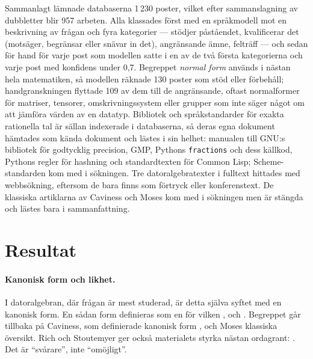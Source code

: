 Sammanlagt lämnade databaserna 1\,230 poster, vilket efter
sammanslagning av dubbletter blir 957 arbeten.  Alla klassades först
med en språkmodell mot en beskrivning av frågan och fyra kategorier ---
stödjer påståendet, kvalificerar det (motsäger, begränsar eller snävar
in det), angränsande ämne, felträff --- och sedan för hand för varje
post som modellen satte i en av de två första kategorierna och varje
post med konfidens under 0,7.  Begreppet \emph{normal form} används i
nästan hela matematiken, så modellen räknade 130 poster som stöd eller
förbehåll; handgranskningen flyttade 109 av dem till de
angränsande, oftast normalformer för matriser, tensorer,
omskrivningssystem eller grupper som inte säger något om att jämföra
värden av en datatyp.
Bibliotek och språkstandarder för exakta rationella tal är sällan
indexerade i databaserna, så deras egna dokument hämtades som kända
dokument och lästes i sin helhet: manualen till GNU:s bibliotek för
godtycklig precision, GMP\autocite{GMPManual}, Pythons
\texttt{fractions}\autocite{PythonFractions} och dess
källkod\autocite{CPythonFractionsSource}, Pythons regler för
hashning\autocite{PythonStdtypes,PythonDataModel} och standardtexten för
Common Lisp\autocite{CLHSRatio}; Scheme-standarden
\autocite{R5RS1998} kom med i sökningen.  Tre datoralgebratexter i
fulltext hittades med webbsökning, eftersom de bara finns som
förtryck eller konferenstext\autocite{RichStoutemyer2013,Price2022Hiding,Fateman1979Simplifier}.
De klassiska artiklarna av Caviness\autocite{Caviness1970} och
Moses\autocite{Moses1971} kom med i sökningen men är stängda och lästes
bara i sammanfattning.

\section{Resultat}
\label{sec:kan-resultat}

\paragraph{Kanonisk form och likhet.}  I datoralgebran, där frågan är
mest studerad, är detta själva syftet med en kanonisk form.  En sådan
form definieras som en för vilken , och
.  Begreppet går tillbaka på
Caviness, som definierade kanonisk form , och Moses
klassiska översikt\autocite{Moses1971}.  Rich och Stoutemyer ger också
materialets styrka nästan ordagrant:
.  Det är \enquote{svårare}, inte \enquote{omöjligt}.

